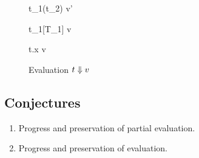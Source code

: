 \begin{figure}[H]

  {t_1(t_2) \e v'}

  {t_1[T_1] \e v}

  {t.x \e v}
\caption{Evaluation $t \Downarrow v$}
\end{figure}

\subsection{Conjectures}

\begin{enumerate}
  \item Progress and preservation of partial evaluation.
  \item Progress and preservation of evaluation.
\end{enumerate}

